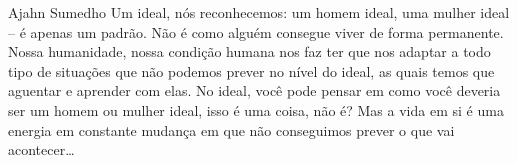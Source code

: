
\begin{quotepage}{0.65\linewidth}{Ajahn Sumedho}
Um ideal, nós reconhecemos: um homem ideal, uma mulher ideal – é apenas
um padrão. Não é como alguém consegue viver de forma permanente. Nossa
humanidade, nossa condição humana nos faz ter que nos adaptar a todo
tipo de situações que não podemos prever no nível do ideal, as quais
temos que aguentar e aprender com elas. No ideal, você pode pensar em
como você deveria ser um homem ou mulher ideal, isso é uma coisa, não
é? Mas a vida em si é uma energia em constante mudança em que não
conseguimos prever o que vai acontecer\ldots{}
\end{quotepage}

